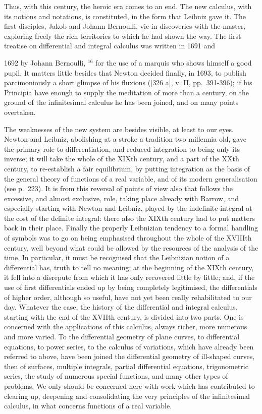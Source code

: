 Thus, with this century, the heroic era comes to an end. The new calculus, with its notions and notations, is constituted, in the form that Leibniz gave it. The first disciples, Jakob and Johann Bernoulli, vie in discoveries with the master, exploring freely the rich territories to which he had shown the way. The first treatise on differential and integral calculus was written in 1691 and

1692 by Johann Bernoulli, \(^{16}\) for the use of a marquis who shows himself a good pupil. It matters little besides that Newton decided finally, in 1693, to publish parcimoniously a short glimpse of his fluxions ({[}326 a{]}, v. II, pp.~391-396); if his Principia have enough to supply the meditation of more than a century, on the ground of the infinitesimal calculus he has been joined, and on many points overtaken.

The weaknesses of the new system are besides visible, at least to our eyes. Newton and Leibniz, abolishing at a stroke a tradition two millennia old, gave the primary role to differentiation, and reduced integration to being only its inverse; it will take the whole of the XIXth century, and a part of the XXth century, to re-establish a fair equilibrium, by putting integration as the basis of the general theory of functions of a real variable, and of its modern generalisation (see p.~223). It is from this reversal of points of view also that follows the excessive, and almost exclusive, role, taking place already with Barrow, and especially starting with Newton and Leibniz, played by the indefinite integral at the cost of the definite integral: there also the XIXth century had to put matters back in their place. Finally the properly Leibnizian tendency to a formal handling of symbols was to go on being emphasised throughout the whole of the XVIIIth century, well beyond what could be allowed by the resources of the analysis of the time. In particular, it must be recognised that the Leibnizian notion of a differential has, truth to tell no meaning; at the beginning of the XIXth century, it fell into a disrepute from which it has only recovered little by little; and, if the use of first differentials ended up by being completely legitimised, the differentials of higher order, although so useful, have not yet been really rehabilitated to our day.
\relax{}
Whatever the case, the history of the differential and integral calculus, starting with the end of the XVIIth century, is divided into two parts. One is concerned with the applications of this calculus, always richer, more numerous and more varied. To the differential geometry of plane curves, to differential equations, to power series, to the calculus of variations, which have already been referred to above, have been joined the differential geometry of ill-shaped curves, then of surfaces, multiple integrals, partial differential equations, trigonometric series, the study of numerous special functions, and many other types of problems. We only should be concerned here with work which has contributed to clearing up, deepening and consolidating the very principles of the infinitesimal calculus, in what concerns functions of a real variable.

